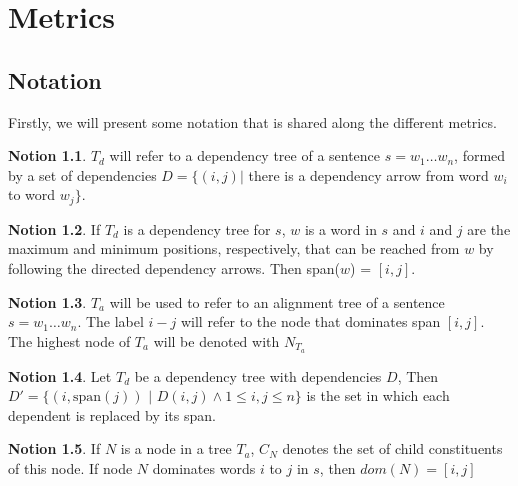 \documentclass{report}
\theoremstyle{definition}
\newtheorem{notion}{Notion}
\theoremstyle{plain}
\begin{document}
%
%

\chapter{Metrics}
\label{appendix:metric}

\section{Notation}

Firstly, we will present some notation that is shared along the different metrics.

\begin{notion}
$T_d$ will refer to a dependency tree of a sentence $s = w_1 \dots w_n$, formed by a set of dependencies $D = \{ (i,j) |$ there is a dependency arrow from word $w_i$ to word $w_j \}$.
\end{notion}

\begin{notion}
If $T_d$ is a dependency tree for $s$, $w$ is a word in $s$ and $i$ and $j$ are the maximum and minimum positions, respectively, that can be reached from $w$ by following the directed dependency arrows. Then span($w$) = $[i,j]$.
\end{notion}

\begin{notion}
$T_a$ will be used to refer to an alignment tree of a sentence $s = w_1 \dots w_n$. The label $i-j$ will refer to the node that dominates span $[i,j]$. The highest node of $T_a$ will be denoted with $N_{T_a}$
\end{notion}

\begin{notion}
Let $T_d$ be a dependency tree with dependencies $D$, Then $D' = \{ (i,\textrm{span}(j))$ $|$ $D(i,j) \land 1 \leq i,j \leq n \}$ is the set in which each dependent is replaced by its span.
\end{notion}

\begin{notion}
If $N$ is a node in a tree $T_a$, $C_N$ denotes the set of child constituents of this node. If node $N$ dominates words $i$ to $j$ in $s$, then $dom(N)= [i,j]$
\end{notion}
\end{document}
